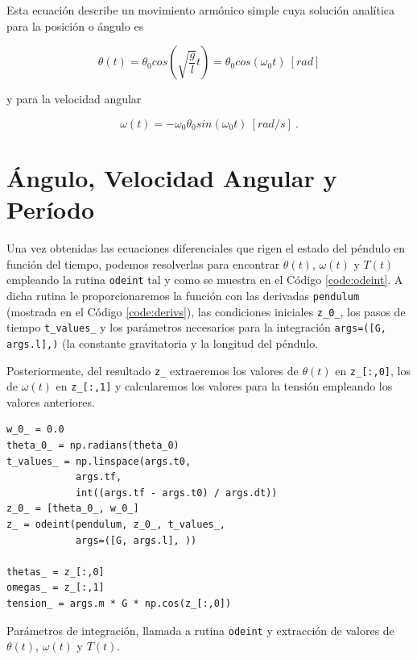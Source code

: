 \documentclass[journal]{IEEEtran}
\newenvironment{code}{\captionsetup{type=listing}}{\par\addvspace{\baselineskip}}
\begin{document}
Esta ecuación describe un movimiento armónico simple cuya solución analítica para la posición o ángulo es

\begin{equation}
  \theta(t) = \theta_0 cos(\sqrt{\displaystyle\frac{g}{l}}t) = \theta_0 cos(\omega_0t) ~[rad]
\end{equation}

y para la velocidad angular

\begin{equation}
  \omega(t) = - \omega_0\theta_0 sin(\omega_0t) ~[rad/s]~.
\end{equation}

\section{Ángulo, Velocidad Angular y Período}

Una vez obtenidas las ecuaciones diferenciales que rigen el estado del péndulo en función del tiempo, podemos resolverlas para encontrar $\theta(t)$, $\omega(t)$ y $T(t)$ empleando la rutina \texttt{odeint} tal y como se muestra en el Código \ref{code:odeint}. A dicha rutina le proporcionaremos la función con las derivadas \texttt{pendulum} (mostrada en el Código \ref{code:derivs}), las condiciones iniciales
\texttt{z_0_}, los pasos de tiempo \texttt{t_values_} y los parámetros necesarios para la integración \texttt{args=([G, args.l],)} (la constante gravitatoria y la longitud del péndulo.

Posteriormente, del resultado \texttt{z_} extraeremos los valores de $\theta(t)$ en \texttt{z_[:,0]}, los de $\omega(t)$ en \texttt{z_[:,1]} y calcularemos los valores para la tensión empleando los valores anteriores.

\medskip

\begin{code}
  \begin{verbatim}
w_0_ = 0.0
theta_0_ = np.radians(theta_0)
t_values_ = np.linspace(args.t0,
            args.tf,
            int((args.tf - args.t0) / args.dt))
z_0_ = [theta_0_, w_0_]
z_ = odeint(pendulum, z_0_, t_values_,
            args=([G, args.l], ))

thetas_ = z_[:,0]
omegas_ = z_[:,1]
tension_ = args.m * G * np.cos(z_[:,0])
  \end{verbatim}
  \caption{Parámetros de integración, llamada a rutina \texttt{odeint} y extracción de valores de $\theta(t)$, $\omega(t)$ y $T(t)$.}
  \label{code:odeint}
\end{code}
\end{document}
